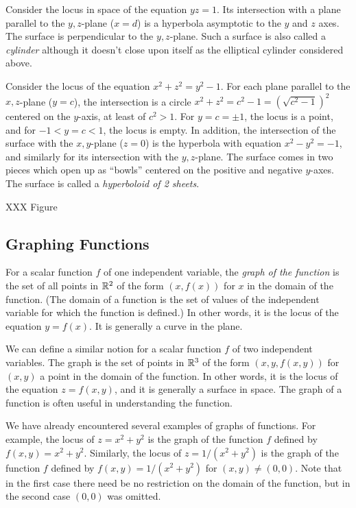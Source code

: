 \begin{example}
	Consider the locus in space of the equation $yz = 1$.   Its intersection
	with a plane parallel to the $y,z$-plane ($x = d$) is a hyperbola
	asymptotic to the $y$ and $z$ axes.  The surface is perpendicular
	to the $y,z$-plane.  Such a surface is also called a \emph{cylinder}
	although it doesn't close upon itself as the elliptical cylinder considered
	above.
\end{example}

\begin{example}
	Consider the locus of the equation $x^2 + z^2 = y^2 - 1$.  For
	each plane parallel to the $x,z$-plane ($y = c$), the intersection
	is a circle $x^2 + z^2 = c^2 - 1 = (\sqrt{c^2 - 1})^2$ centered
	on the $y$-axis, at least of $c^2 > 1$.  For $y = c = \pm 1$,
	the locus is a point, and for $-1 < y = c < 1$, the locus is
	empty.   In addition, the intersection of the surface with the
	$x,y$-plane ($z = 0$) is the hyperbola with equation $x^2 - y^2
	 = -1$, and similarly for its intersection with the $y,z$-plane.
	The surface comes in two pieces which open up as ``bowls'' centered
	on the positive and negative $y$-axes.   The surface is called
	a \emph{hyperboloid of 2 sheets}.    

	XXX Figure
\end{example}

\subsection{Graphing Functions}
For a scalar function $f$ of one independent variable, 
the \emph{graph of the function} is the set of
all points in $\mathbb{R}^2$  of the form  $(x, f(x))$
for $x$ in the domain of the function.   (The domain of a function
is the set of values of the independent variable for which the
function is defined.)  In other words, it is the locus of the
equation $y = f(x)$.  It is generally a curve in the plane.

We can define a similar notion for a scalar function $f$ of two
independent variables.  The graph is the
set of points in $\mathbb{R}^3$  of the form $(x, y, f(x,y))$
for $(x,y)$ a point in the domain of the function.  In other words,
it is the locus of the equation $z = f(x,y)$, and it is generally
a surface in space.
The graph of a function is often useful in understanding the
function.

We have already encountered several examples of graphs of functions.
For example, the locus of $z = x^2 + y^2$ is the graph of the
function $f$ defined by $f(x,y) = x^2 +y^2$.   Similarly, the locus
of $z = 1/(x^2 + y^2)$ is the graph of the function $f$ defined by
$f(x,y) = 1/(x^2 + y^2)$ for $(x,y) \not= (0,0)$. 
  Note that in the first case there need
be no restriction on the domain of the function, but in the second
case $(0,0)$ was omitted.  

